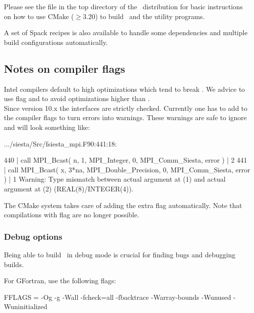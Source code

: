 Please see the file  in the top
directory of the \siesta\ distribution for basic instructions
on how to use CMake ($\ge$3.20) to build \siesta\ and the utility
programs.

A set of Spack recipes is also available to handle some dependencies
and multiple build configurations automatically.

\subsection{Notes on compiler flags}

\note Intel compilers default to high optimizations which tend to
break \siesta. We advice to use  flag and to
avoid optimizations higher than .
\\


\note Since  version 10.x the interfaces are strictly
checked. Currently one has to add 
to the compiler flags to turn errors into warnings. These warnings are
safe to ignore and will look something like:
\begin{shellexample}[xleftmargin=1ex,fontsize=\footnotesize]
  .../siesta/Src/fsiesta_mpi.F90:441:18:

  440 |   call MPI_Bcast( n, 1, MPI_Integer, 0, MPI_Comm_Siesta, error )
      |                  2
  441 |   call MPI_Bcast( x, 3*na, MPI_Double_Precision, 0, MPI_Comm_Siesta, error )
      |                  1
Warning: Type mismatch between actual argument at (1) and actual argument at (2) (REAL(8)/INTEGER(4)).
\end{shellexample}
The CMake system takes care of adding the extra flag automatically.
Note that compilations with  flag are no longer possible.
\\


\subsubsection{Debug options}
\label{sec:build:debug}

Being able to build \siesta\ in debug mode is crucial for finding bugs
and debugging builds.

For GFortran, use the following flags:
\begin{shellexample}
  FFLAGS = -Og -g -Wall -fcheck=all -fbacktrace -Warray-bounds -Wunused -Wuninitialized
\end{shellexample}

